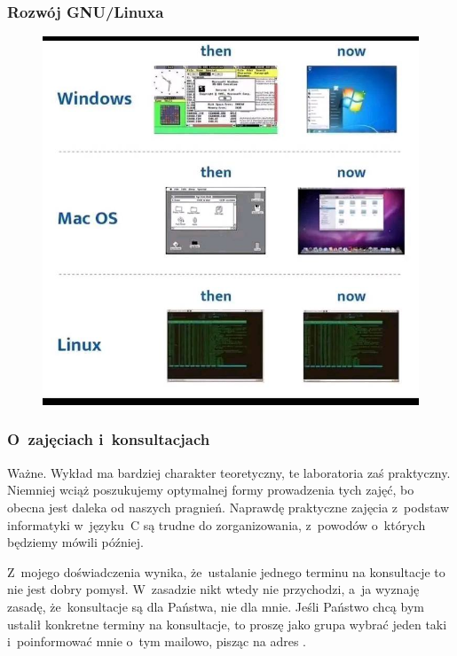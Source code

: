 \documentclass[10pt,t]{beamer}
\begin{document}
\begin{frame}
  \frametitle{Rozwój GNU/Linuxa}


  \begin{figure}

    \label{fig:Evolution-of-OS}

    \centering


    \includegraphics[scale=0.3]
    {./Presentations-pictures/Evolution-of-operating-systems.jpg}

  \end{figure}

\end{frame}





\begin{frame}
  \frametitle{O~zajęciach i~konsultacjach}


  \alert{Ważne.} Wykład ma bardziej charakter teoretyczny, te laboratoria
  zaś praktyczny. Niemniej wciąż poszukujemy optymalnej formy prowadzenia
  tych zajęć, bo obecna jest daleka od naszych pragnień. Naprawdę
  praktyczne zajęcia z~podstaw informatyki w~języku~C są trudne do
  zorganizowania, z~powodów o~których będziemy mówili później.

  Z~mojego doświadczenia wynika, że~ustalanie jednego terminu na konsultacje
  to nie jest dobry pomysł. W~zasadzie nikt wtedy nie przychodzi, a~ja
  wyznaję zasadę, że~konsultacje są dla Państwa, nie dla mnie. Jeśli
  Państwo chcą bym ustalił konkretne terminy na konsultacje, to proszę jako
  grupa wybrać jeden taki i~poinformować mnie o~tym mailowo, pisząc na
  adres \email.

\end{frame}
\end{document}
